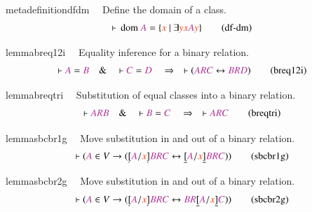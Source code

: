 \begin{restatable}{metadefinition}{dfdm}~~ Define the domain of a class.  
\begin{align}
\vdash \,\mathrm{dom}~ \mc{A} = \{ \msc{x}~\vert~\exists \msc{y} \msc{x} \mc{A}
    \msc{y} \}\label{eq:df-dm}\tag{df-dm}
\end{align}
\end{restatable}

\begin{restatable}{lemma}{breq12i}~~ Equality inference for a binary relation. 
~  ~
\begin{align}
\vdash \mc{A} = \mc{B}\quad\&\quad \vdash \mc{C} = \mc{D}\quad\Rightarrow\quad
    \vdash ( \mc{A} \mc{R} \mc{C} \leftrightarrow \mc{B} \mc{R} \mc{D}
    )\label{eq:breq12i}\tag{breq12i}
\end{align}
\end{restatable}

\begin{restatable}{lemma}{breqtri}~~ Substitution of equal classes into a binary
relation.  ~
\begin{align}
\vdash \mc{A} \mc{R} \mc{B}\quad\&\quad \vdash \mc{B} =
    \mc{C}\quad\Rightarrow\quad \vdash \mc{A} \mc{R}
    \mc{C}\label{eq:breqtri}\tag{breqtri}
\end{align}
\end{restatable}

\begin{restatable}{lemma}{sbcbr1g}~~ Move substitution in and out of a binary
relation.  ~
\begin{align}
\vdash ( \mc{A} \in V \rightarrow ( \underaccent{\dot}{[} \mc{A} / \msc{x}
    \underaccent{\dot}{]} \mc{B} \mc{R} \mc{C} \leftrightarrow \underline{[}
    \mc{A} / \msc{x} \underline{]} \mc{B} \mc{R} \mc{C} )
    )\label{eq:sbcbr1g}\tag{sbcbr1g}
\end{align}
\end{restatable}

\begin{restatable}{lemma}{sbcbr2g}~~ Move substitution in and out of a binary
relation.  ~
\begin{align}
\vdash ( \mc{A} \in V \rightarrow ( \underaccent{\dot}{[} \mc{A} / \msc{x}
    \underaccent{\dot}{]} \mc{B} \mc{R} \mc{C} \leftrightarrow \mc{B} \mc{R}
    \underline{[} \mc{A} / \msc{x} \underline{]} \mc{C} )
    )\label{eq:sbcbr2g}\tag{sbcbr2g}
\end{align}
\end{restatable}

